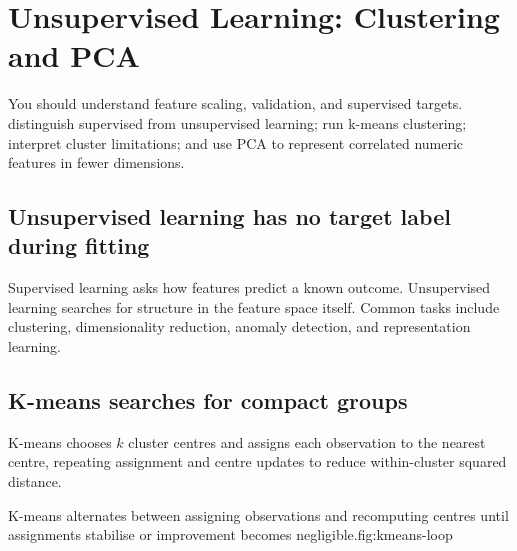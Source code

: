 \chapter{Unsupervised Learning: Clustering and PCA}
\label{chap:unsupervised}
\chapterguide
  {You should understand feature scaling, validation, and supervised targets.}
  {distinguish supervised from unsupervised learning; run k-means clustering; interpret cluster limitations; and use PCA to represent correlated numeric features in fewer dimensions.}

\section{Unsupervised learning has no target label during fitting}
Supervised learning asks how features predict a known outcome. Unsupervised learning searches for structure in the feature space itself. Common tasks include clustering, dimensionality reduction, anomaly detection, and representation learning.

\section{K-means searches for compact groups}
K-means chooses \(k\) cluster centres and assigns each observation to the nearest centre, repeating assignment and centre updates to reduce within-cluster squared distance.

\begin{utpfig}{K-means alternates between assigning observations and recomputing centres until assignments stabilise or improvement becomes negligible.}{fig:kmeans-loop}
\end{utpfig}


